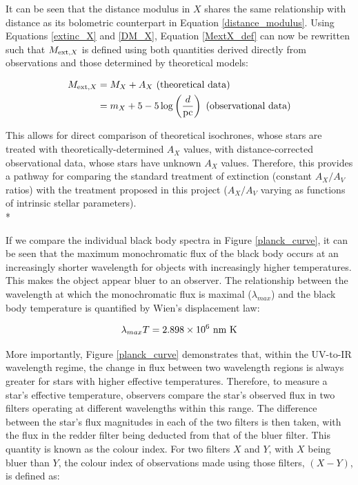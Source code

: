 \documentclass[12pt, a4paper]{report}
\begin{document}
It can be seen that the distance modulus in $X$ shares the same relationship with distance as its bolometric counterpart in Equation \ref{distance_modulus}. Using Equations \ref{extinc_X} and \ref{DM_X}, Equation \ref{MextX_def} can now be rewritten such that $M_{\textnormal{ext},X}$ is defined using both quantities derived directly from observations and those determined by theoretical models:

\begin{align}
\begin{split}
M_{\textnormal{ext},X} &= M_{X} + A_{X} \textnormal{ (theoretical data)}\\
 &= m_{X} + 5 - 5\log\left(\frac{d}{\textnormal{pc}}\right) \textnormal{ (observational data)}
\end{split}
\label{MextX_eq}
\end{align}

This allows for direct comparison of theoretical isochrones, whose stars are treated with theoretically-determined $A_{X}$ values, with distance-corrected observational data, whose stars have unknown $A_{X}$ values. Therefore, this provides a pathway for comparing the standard treatment of extinction (constant $A_{X}/A_{V}$ ratios) with the treatment proposed in this project ($A_{X}/A_{V}$ varying as functions of intrinsic stellar parameters). \\*

If we compare the individual black body spectra in Figure \ref{planck_curve}, it can be seen that the maximum monochromatic flux of the black body occurs at an increasingly shorter wavelength for objects with increasingly higher temperatures. This makes the object appear bluer to an observer. The relationship between the wavelength at which the monochromatic flux is maximal ($\lambda_{max}$) and the black body temperature is quantified by Wien's displacement law:

\begin{equation}
\lambda_{max} T = 2.898 \times 10^{6} \textnormal{ nm K}
\label{wien_eq}
\end{equation}

More importantly, Figure \ref{planck_curve} demonstrates that, within the UV-to-IR wavelength regime, the change in flux between two wavelength regions is always greater for stars with higher effective temperatures. Therefore, to measure a star's effective temperature, observers compare the star's observed flux in two filters operating at different wavelengths within this range. The difference between the star's flux magnitudes in each of the two filters is then taken, with the flux in the redder filter being deducted from that of the bluer filter. This quantity is known as the colour index. For two filters $X$ and $Y$, with $X$ being bluer than $Y$, the colour index of observations made using those filters, $(X-Y)$, is defined as:
\end{document}
